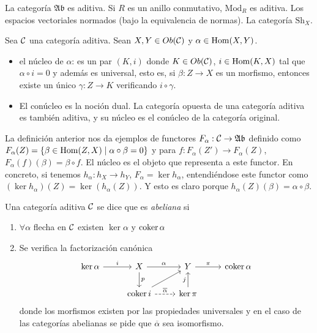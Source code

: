 \documentclass[GA.tex]{subfiles}
\begin{document}
\begin{ej}
La categoría $\mathfrak{Ab}$ es aditiva. Si $R$ es un anillo conmutativo, $\mathrm{Mod}_R$ es aditiva. Los espacios vectoriales normados (bajo la equivalencia de normas). La categoría $\mathrm{Sh}_X$.
\end{ej}

\begin{defi}
Sea $\mathcal{C}$ una categoría aditiva. Sean $X,Y\in Ob(\mathcal{C})$ y $\alpha\in\operatorname{Hom}(X,Y)$.
\begin{itemize}
\item el núcleo de $\alpha$: es un par $(K,i)$ donde $K\in Ob(\mathcal{C})$, $i\in\operatorname{Hom}(K,X)$ tal que $\alpha\circ i=0$ y además es universal, esto es, si $\beta:Z\to X$ es un morfismo, entonces existe un único $\gamma :Z\to K$ verificando $i\circ\gamma$. 

\item El conúcleo es la noción dual. La categoría opuesta de una categoría aditiva es también aditiva, y su núcleo es el conúcleo de la categoría original. 
\end{itemize}
\end{defi}

\begin{ej}
La definición anterior nos da ejemplos de functores $F_{\alpha}:\mathcal{C}\to\mathfrak{Ab}$ definido como $F_{\alpha}(Z)=\{\beta\in\operatorname{Hom}(Z,X)\mid \alpha\circ\beta=0\}$ y para $f:F_{\alpha}(Z')\to F_{\alpha}(Z)$, $F_{\alpha}(f)(\beta)=\beta\circ f$. El núcleo es el objeto que representa a este functor. En concreto, si tenemos $h_{\alpha}:h_X\to h_Y$, $F_{\alpha}=\ker h_{\alpha}$, entendiéndose este functor como $(\ker h_{\alpha})(Z)=\ker(h_{\alpha}(Z))$. Y esto es claro porque $h_{\alpha}(Z)(\beta)=\alpha\circ\beta$. 


\end{ej}

\begin{defi}
Una categoría aditiva $\mathcal{C}$ se dice que es \emph{abeliana} si
\begin{enumerate}
\item $\forall\alpha$ flecha en $\mathcal{C}$ existen $\ker\alpha$ y $\operatorname{coker}\alpha$
\item Se verifica la factorización canónica
\[
\begin{tikzcd}
\ker\alpha\arrow[r, "i"] & X\arrow[r, "\alpha"]\arrow[d, "p"] & Y\arrow[r, "\pi"] & \coker\alpha\\
&     \coker i\arrow[ur] \arrow[r, dashed, "\overline{\alpha}"] & \ker\pi\arrow[u, "j"] &
\end{tikzcd}
\]
donde los morfismos existen por las propiedades universales y en el caso de las categorías abelianas se pide que $\overline{\alpha}$ sea isomorfismo. 
\end{enumerate}

\end{defi}
\end{document}
